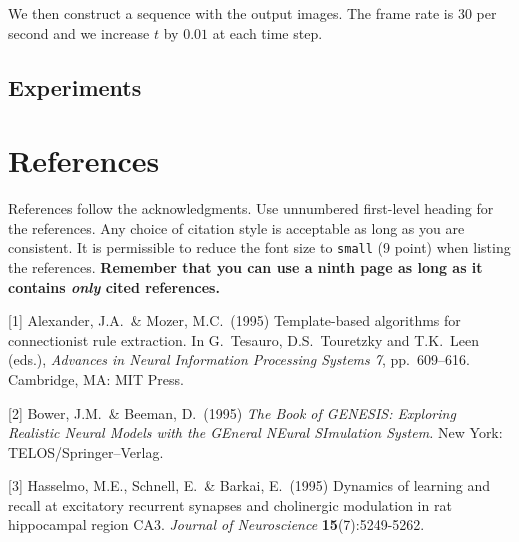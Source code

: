 \documentclass{article}
\begin{document}
We then construct a sequence with the output images. The frame rate is 30 per second and we increase $t$ by $0.01$ at each time step.

\subsection{Experiments}

\section*{References}

References follow the acknowledgments. Use unnumbered first-level
heading for the references. Any choice of citation style is acceptable
as long as you are consistent. It is permissible to reduce the font
size to \verb+small+ (9 point) when listing the references. {\bf
  Remember that you can use a ninth page as long as it contains
  \emph{only} cited references.}
\medskip

\small

[1] Alexander, J.A.\ \& Mozer, M.C.\ (1995) Template-based algorithms
for connectionist rule extraction. In G.\ Tesauro, D.S.\ Touretzky and
T.K.\ Leen (eds.), {\it Advances in Neural Information Processing
  Systems 7}, pp.\ 609--616. Cambridge, MA: MIT Press.

[2] Bower, J.M.\ \& Beeman, D.\ (1995) {\it The Book of GENESIS:
  Exploring Realistic Neural Models with the GEneral NEural SImulation
  System.}  New York: TELOS/Springer--Verlag.

[3] Hasselmo, M.E., Schnell, E.\ \& Barkai, E.\ (1995) Dynamics of
learning and recall at excitatory recurrent synapses and cholinergic
modulation in rat hippocampal region CA3. {\it Journal of
  Neuroscience} {\bf 15}(7):5249-5262.
\end{document}
